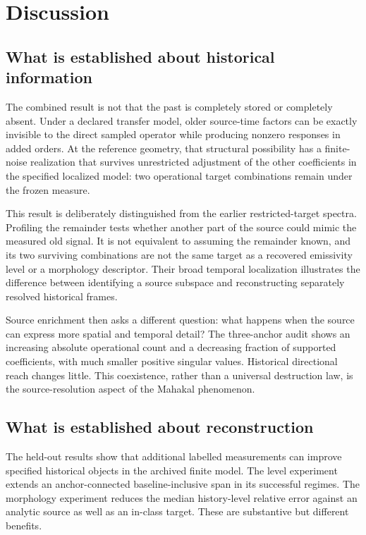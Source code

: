 \section{Discussion}\label{sec:discussion}
\subsection{What is established about historical information}
The combined result is not that the past is completely stored or completely absent. Under a declared transfer model, older source-time factors can be exactly invisible to the direct sampled operator while producing nonzero responses in added orders. At the reference geometry, that structural possibility has a finite-noise realization that survives unrestricted adjustment of the other coefficients in the specified localized model: two operational target combinations remain under the frozen measure.

This result is deliberately distinguished from the earlier restricted-target spectra. Profiling the remainder tests whether another part of the source could mimic the measured old signal. It is not equivalent to assuming the remainder known, and its two surviving combinations are not the same target as a recovered emissivity level or a morphology descriptor. Their broad temporal localization illustrates the difference between identifying a source subspace and reconstructing separately resolved historical frames.

Source enrichment then asks a different question: what happens when the source can express more spatial and temporal detail? The three-anchor audit shows an increasing absolute operational count and a decreasing fraction of supported coefficients, with much smaller positive singular values. Historical directional reach changes little. This coexistence, rather than a universal destruction law, is the source-resolution aspect of the Mahakal phenomenon.

\subsection{What is established about reconstruction}
The held-out results show that additional labelled measurements can improve specified historical objects in the archived finite model. The level experiment extends an anchor-connected baseline-inclusive span in its successful regimes. The morphology experiment reduces the median history-level relative error against an analytic source as well as an in-class target. These are substantive but different benefits.

